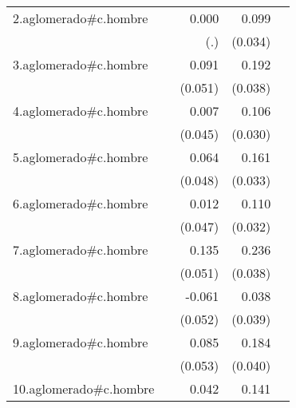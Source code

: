{\begin{longtable}{l*{4}{D{.}{.}{-1}}}
\addlinespace
2.aglomerado#c.hombre&                     &       0.000         &       0.099\sym{**} &                     \\
            &                     &         (.)         &     (0.034)         &                     \\
\addlinespace
3.aglomerado#c.hombre&                     &       0.091         &       0.192\sym{***}&                     \\
            &                     &     (0.051)         &     (0.038)         &                     \\
\addlinespace
4.aglomerado#c.hombre&                     &       0.007         &       0.106\sym{***}&                     \\
            &                     &     (0.045)         &     (0.030)         &                     \\
\addlinespace
5.aglomerado#c.hombre&                     &       0.064         &       0.161\sym{***}&                     \\
            &                     &     (0.048)         &     (0.033)         &                     \\
\addlinespace
6.aglomerado#c.hombre&                     &       0.012         &       0.110\sym{***}&                     \\
            &                     &     (0.047)         &     (0.032)         &                     \\
\addlinespace
7.aglomerado#c.hombre&                     &       0.135\sym{**} &       0.236\sym{***}&                     \\
            &                     &     (0.051)         &     (0.038)         &                     \\
\addlinespace
8.aglomerado#c.hombre&                     &      -0.061         &       0.038         &                     \\
            &                     &     (0.052)         &     (0.039)         &                     \\
\addlinespace
9.aglomerado#c.hombre&                     &       0.085         &       0.184\sym{***}&                     \\
            &                     &     (0.053)         &     (0.040)         &                     \\
\addlinespace
10.aglomerado#c.hombre&                     &       0.042         &       0.141\sym{***}&                     \\

\end{longtable}}
